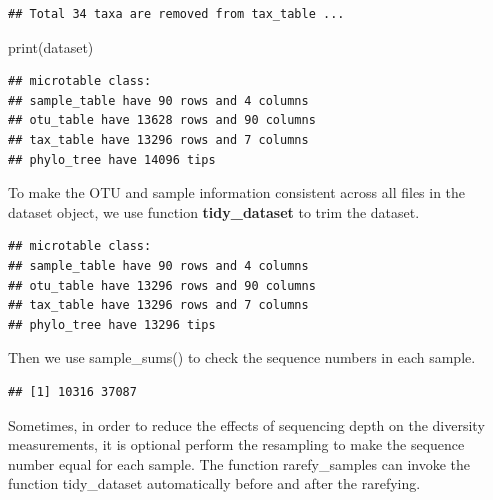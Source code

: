 \documentclass[
]{book}
\newenvironment{Shaded}{\begin{snugshade}}{\end{snugshade}}
\newcommand{\FunctionTok}[1]{\textcolor[rgb]{0.00,0.00,0.00}{#1}}
\newcommand{\NormalTok}[1]{#1}
\newcommand{\SpecialCharTok}[1]{\textcolor[rgb]{0.00,0.00,0.00}{#1}}
\begin{document}
\begin{verbatim}
## Total 34 taxa are removed from tax_table ...
\end{verbatim}

\begin{Shaded}
\begin{Highlighting}[]
\FunctionTok{print}\NormalTok{(dataset)}
\end{Highlighting}
\end{Shaded}

\begin{verbatim}
## microtable class:
## sample_table have 90 rows and 4 columns
## otu_table have 13628 rows and 90 columns
## tax_table have 13296 rows and 7 columns
## phylo_tree have 14096 tips
\end{verbatim}

To make the OTU and sample information consistent across all files in the dataset object, we use function \textbf{tidy\_dataset} to trim the dataset.

\begin{Shaded}
\end{Shaded}

\begin{verbatim}
## microtable class:
## sample_table have 90 rows and 4 columns
## otu_table have 13296 rows and 90 columns
## tax_table have 13296 rows and 7 columns
## phylo_tree have 13296 tips
\end{verbatim}

Then we use sample\_sums() to check the sequence numbers in each sample.

\begin{Shaded}
\end{Shaded}

\begin{verbatim}
## [1] 10316 37087
\end{verbatim}

Sometimes, in order to reduce the effects of sequencing depth on the diversity measurements,
it is optional perform the resampling to make the sequence number equal for each sample.
The function rarefy\_samples can invoke the function tidy\_dataset automatically before and after the rarefying.
\end{document}
